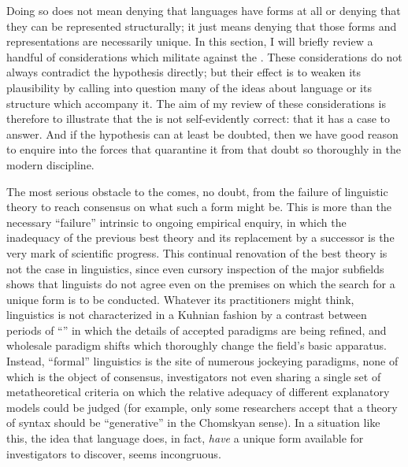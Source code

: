 \documentclass[output=paper]{langscibook}
\begin{document}
Doing so does not mean denying that languages have forms at all or denying that they can be represented structurally; it just means denying that those forms and representations are necessarily unique. In this section, I will briefly review a handful of considerations which militate against the . These considerations do not always contradict the hypothesis directly; but their effect is to weaken its plausibility by calling into question many of the ideas about language or its structure which accompany it. The aim of my review of these considerations is therefore to illustrate that the  is not self-evidently correct: that it has a case to answer. And if the hypothesis can at least be doubted, then we have good reason to enquire into the forces that quarantine it from that doubt so thoroughly in the modern discipline.

The most serious obstacle to the  comes, no doubt, from the failure of linguistic theory to reach consensus on what such a form might be. This is more than the necessary ``failure'' intrinsic to ongoing empirical enquiry, in which the inadequacy of the previous best theory and its replacement by a successor is the very mark of scientific progress. This continual renovation of the best theory is not the case in linguistics, since even cursory inspection of the major subfields shows that linguists do not agree even on the premises on which the search for a unique form is to be conducted. Whatever its practitioners might think, linguistics is not characterized in a Kuhnian fashion by a contrast between periods of ``'' in which the details of accepted paradigms are being refined, and wholesale paradigm shifts which thoroughly change the field's basic apparatus. Instead, ``formal'' linguistics is the site of numerous jockeying paradigms, none of which is the object of consensus, investigators not even sharing a single set of metatheoretical criteria on which the relative adequacy of different explanatory models could be judged (for example, only some researchers accept that a theory of syntax should be ``generative'' in the Chomskyan sense). In a situation like this, the idea that language does, in fact, \emph{have} a unique form available for investigators to discover, seems incongruous.
\end{document}
